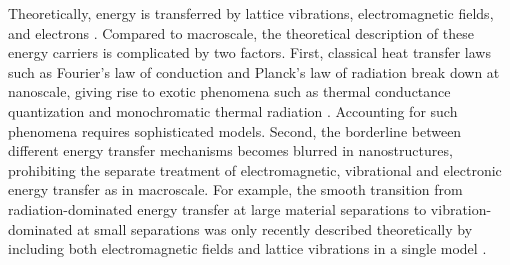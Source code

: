 Theoretically, energy is transferred by lattice vibrations, electromagnetic fields, and electrons \cite{chen}. Compared to macroscale, the theoretical description of these energy carriers is complicated by two factors. First, classical heat transfer laws such as Fourier's law of conduction \cite{fourier} and Planck's law of radiation \cite{planck00a} break down at nanoscale, giving rise to exotic phenomena such as thermal conductance quantization \cite{rego98,schwab00} and monochromatic thermal radiation \cite{carminati99,shchegrov00}. Accounting for such phenomena requires sophisticated models. Second, the borderline between different energy transfer mechanisms becomes blurred in nanostructures, prohibiting the separate treatment of electromagnetic, vibrational and electronic energy transfer as in macroscale. For example, the smooth transition from radiation-dominated energy transfer at large material separations to vibration-dominated at small separations was only recently described theoretically by including both electromagnetic fields and lattice vibrations in a single model \cite{xiong14,chiloyan15}. 







